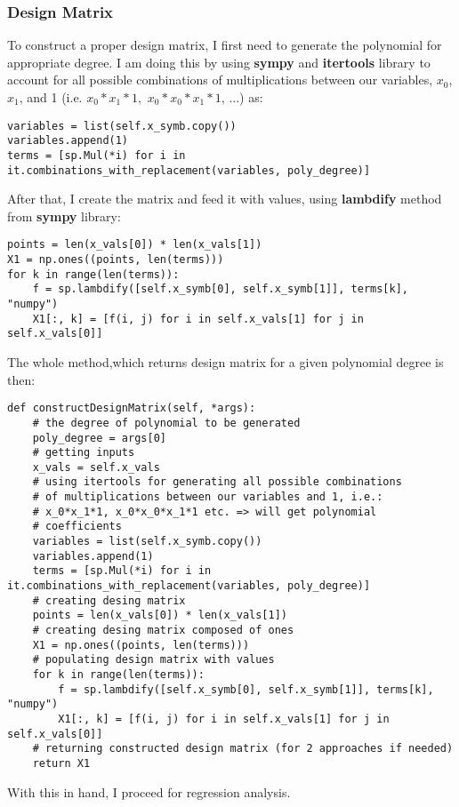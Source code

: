 \subsubsection{Design Matrix}
To construct a proper design matrix, I first need to generate the polynomial for appropriate degree. I am doing this by using \textbf{sympy} and \textbf{itertools} library to account for all possible combinations of multiplications between our variables, $x_0$, $x_1$, and 1 (i.e.
$x_0*x_1*1,$ $x_0*x_0*x_1*1$, ...) as:
\begin{lstlisting}
variables = list(self.x_symb.copy())
variables.append(1)
terms = [sp.Mul(*i) for i in it.combinations_with_replacement(variables, poly_degree)]
\end{lstlisting}
After that, I create the matrix and feed it with values, using \textbf{lambdify} method from \textbf{sympy} library:
\begin{lstlisting}
points = len(x_vals[0]) * len(x_vals[1])
X1 = np.ones((points, len(terms)))
for k in range(len(terms)):
    f = sp.lambdify([self.x_symb[0], self.x_symb[1]], terms[k], "numpy")
    X1[:, k] = [f(i, j) for i in self.x_vals[1] for j in self.x_vals[0]]
\end{lstlisting}
The whole method,which returns design matrix for a given polynomial degree is then:
\begin{lstlisting}
def constructDesignMatrix(self, *args):
    # the degree of polynomial to be generated
    poly_degree = args[0]
    # getting inputs
    x_vals = self.x_vals
    # using itertools for generating all possible combinations
    # of multiplications between our variables and 1, i.e.:
    # x_0*x_1*1, x_0*x_0*x_1*1 etc. => will get polynomial
    # coefficients
    variables = list(self.x_symb.copy())
    variables.append(1)
    terms = [sp.Mul(*i) for i in it.combinations_with_replacement(variables, poly_degree)]
    # creating desing matrix
    points = len(x_vals[0]) * len(x_vals[1])
    # creating desing matrix composed of ones
    X1 = np.ones((points, len(terms)))
    # populating design matrix with values
    for k in range(len(terms)):
        f = sp.lambdify([self.x_symb[0], self.x_symb[1]], terms[k], "numpy")
        X1[:, k] = [f(i, j) for i in self.x_vals[1] for j in self.x_vals[0]]
    # returning constructed design matrix (for 2 approaches if needed)
    return X1
\end{lstlisting}
With this in hand, I proceed for regression analysis.

